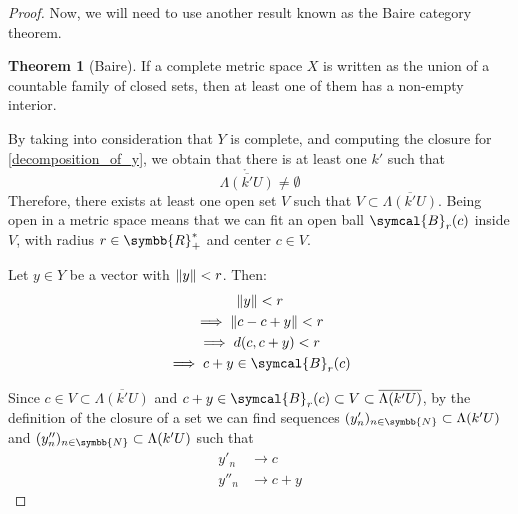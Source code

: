 \documentclass[a4paper, 12pt]{article}
\theoremstyle{definition}
\newtheorem*{theorem}{Theorem}
\newcommand{\naturals}{\symbb{N}}
\newcommand{\reals}{\symbb{R}}
\newcommand{\ball}{\symcal{B}}
\DeclarePairedDelimiter{\norm}{\lVert}{\rVert}
\begin{document}
\begin{proof}
Now, we will need to use another result known as the Baire category theorem.
\begin{theorem}[Baire]
If a complete metric space \(X\) is written as the union of a countable family of closed sets, then at least one of them has a non-empty interior.
\end{theorem}

By taking into consideration that \(Y\) is complete, and computing the closure for \ref{decomposition_of_y}, we obtain that there is at least one \(k'\) such that
\[
    \mathring{\overline{\Lambda(k' U)}} \neq \emptyset
\]
Therefore, there exists at least one open set \(V\) such that \(V \subset \overline{\Lambda(k'U)}\). Being open in a metric space means that we can fit an open ball \(\ball_r (c)\) inside \(V\), with radius \(r \in \reals^*_+\) and center \(c \in V\).
\begin{figure}[!ht]
    \centering
\end{figure}

Let \(y \in Y\) be a vector with \(\norm{y} < r\). Then:
\begin{gather*}
    \norm{y} < r \\
    \implies \norm{c - c + y} < r \\
    \implies d(c, c + y) < r \\
    \implies c + y \in \ball_r (c)
\end{gather*}

Since \(c \in V \subset \overline{\Lambda(k'U)}\) and \(c + y \in \ball_r (c) \subset V \subset \overline{\Lambda(k'U)}\), by the definition of the closure of a set we can find sequences \((y'_n)_{n \in \naturals} \subset \Lambda(k'U)\) and \((y''_n)_{n \in \naturals} \subset \Lambda(k'U)\) such that
\begin{align*}
    y'_n &\rightarrow c \\
    y''_n &\rightarrow c + y
\end{align*}


\end{proof}
\end{document}
